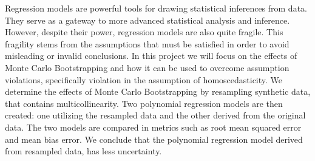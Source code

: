 Regression models are powerful tools for drawing statistical inferences from data. They serve as a gateway to more advanced statistical analysis and inference. However, despite their power, regression models are also quite fragile. This fragility stems from the assumptions that must be satisfied in order to avoid misleading or invalid conclusions. In this project we will focus on the effects of Monte Carlo Bootstrapping and how it can be used to overcome assumption violations, specifically violation in the assumption of homoscedasticity. We determine the effects of Monte Carlo Bootstrapping by resampling synthetic data, that contains multicollinearity. Two polynomial regression models are then created: one utilizing the resampled data and the other derived from the original data. The two models are compared in metrics such as root mean squared error and mean bias error. We conclude that the polynomial regression model derived from resampled data, has less uncertainty. 